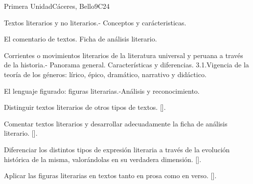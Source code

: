 \begin{syllabus}
\begin{outcomes}
    \item {}
    \item {}
\end{outcomes}
\begin{competences}
    \item {}
\end{competences}

\begin{unit}{}{Primera Unidad}{Cáceres, Bello}{9}{C24}
\begin{topics}
	\item Textos literarios y no literarios.- Conceptos y carácteristicas.
	\item El comentario de textos. Ficha de análisis literario.
	\item Corrientes o movimientos literarios de la literatura universal y peruana a través de la historia.- Panorama general. Características y diferencias.
	3.1.Vigencia de la teoría de los géneros: lírico, épico, dramático, narrativo y didáctico.
	\item El lenguaje figurado: figuras literarias.-Análisis y reconocimiento.
\end{topics}
\begin{learningoutcomes}
	\item Distinguir textos literarios de otros tipos de textos. [\Usage].
	\item Comentar textos literarios y desarrollar adecuadamente la ficha de análisis literario. [\Usage].
	\item Diferenciar los distintos tipos de expresión literaria a través de la evolución histórica de la misma, valorándolas en su verdadera dimensión. [\Usage].
	\item Aplicar las figuras literarias en textos tanto en prosa como en verso. [\Usage].
\end{learningoutcomes}
\end{unit}


\end{syllabus}
